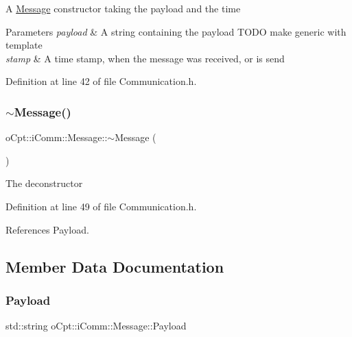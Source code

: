 A \hyperlink{structo_cpt_1_1i_comm_1_1_message}{Message} constructor taking the payload and the time 
\begin{DoxyParams}{Parameters}
{\em payload} & A string containing the payload T\+O\+DO make generic with template \\
\hline
{\em stamp} & A time stamp, when the message was received, or is send \\
\hline
\end{DoxyParams}


Definition at line 42 of file Communication.\+h.

\hypertarget{structo_cpt_1_1i_comm_1_1_message_a9f3e20489859c6ff3222f88234b1c93c}{}\label{structo_cpt_1_1i_comm_1_1_message_a9f3e20489859c6ff3222f88234b1c93c} 
\subsubsection{\texorpdfstring{$\sim$\+Message()}{~Message()}}
{\footnotesize\ttfamily o\+Cpt\+::i\+Comm\+::\+Message\+::$\sim$\+Message (\begin{DoxyParamCaption}{ }\end{DoxyParamCaption})\hspace{0.3cm}{\ttfamily [inline]}}

The deconstructor 

Definition at line 49 of file Communication.\+h.



References Payload.



\subsection{Member Data Documentation}
\hypertarget{structo_cpt_1_1i_comm_1_1_message_a46117baa6509fd31f7e8cb187cc3f8a9}{}\label{structo_cpt_1_1i_comm_1_1_message_a46117baa6509fd31f7e8cb187cc3f8a9} 
\subsubsection{\texorpdfstring{Payload}{Payload}}
{\footnotesize\ttfamily std\+::string o\+Cpt\+::i\+Comm\+::\+Message\+::\+Payload}



